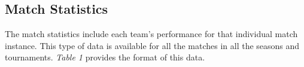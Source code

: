 \documentclass{article}
\begin{document}
\begin{multicols}{2}
	\subsection{Match Statistics}
	The match statistics include each team's performance for that individual match instance. This type of data is available for all the matches in all the seasons and tournaments. \textit{Table 1} provides the format of this data. 	\newline \linebreak

	\end{multicols}  	
	\begin{center}
	\end{center}
	\begin{center}	
	\end{center}
\end{document}
